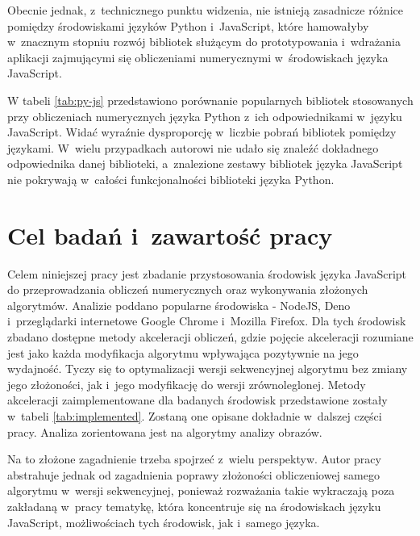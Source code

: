 Obecnie jednak, z~technicznego punktu widzenia, nie istnieją zasadnicze różnice pomiędzy środowiskami języków Python i~JavaScript, które hamowałyby w~znacznym stopniu rozwój bibliotek służącym do prototypowania i~wdrażania aplikacji zajmującymi się obliczeniami numerycznymi w~środowiskach języka JavaScript.

W tabeli \ref{tab:py-js} przedstawiono porównanie popularnych bibliotek stosowanych przy obliczeniach numerycznych języka Python z~ich odpowiednikami w~języku JavaScript. Widać wyraźnie dysproporcję w~liczbie pobrań bibliotek pomiędzy językami. W~wielu przypadkach autorowi nie udało się znaleźć dokładnego odpowiednika danej biblioteki, a~znalezione zestawy bibliotek języka JavaScript nie pokrywają w~całości funkcjonalności biblioteki języka Python.


\section{Cel badań i~zawartość pracy}


 
Celem niniejszej pracy jest zbadanie przystosowania środowisk języka JavaScript do przeprowadzania obliczeń numerycznych oraz wykonywania złożonych algorytmów. Analizie poddano popularne środowiska - NodeJS, Deno i~przeglądarki internetowe Google Chrome i~Mozilla Firefox. Dla tych środowisk zbadano dostępne metody akceleracji obliczeń, gdzie pojęcie akceleracji rozumiane jest jako każda modyfikacja algorytmu wpływająca pozytywnie na jego wydajność. Tyczy się to optymalizacji wersji sekwencyjnej algorytmu bez zmiany jego złożoności, jak i~jego modyfikację do wersji zrównoleglonej. Metody akceleracji zaimplementowane dla badanych środowisk przedstawione zostały w~tabeli \ref{tab:implemented}. Zostaną one opisane dokładnie w~dalszej części pracy. Analiza zorientowana jest na algorytmy analizy obrazów.

Na to złożone zagadnienie trzeba spojrzeć z~wielu perspektyw. Autor pracy abstrahuje jednak od zagadnienia poprawy złożoności obliczeniowej samego algorytmu w~wersji sekwencyjnej, ponieważ rozważania takie wykraczają poza zakładaną w~pracy tematykę, która koncentruje się na środowiskach języku JavaScript, możliwościach tych środowisk, jak i~samego języka.

